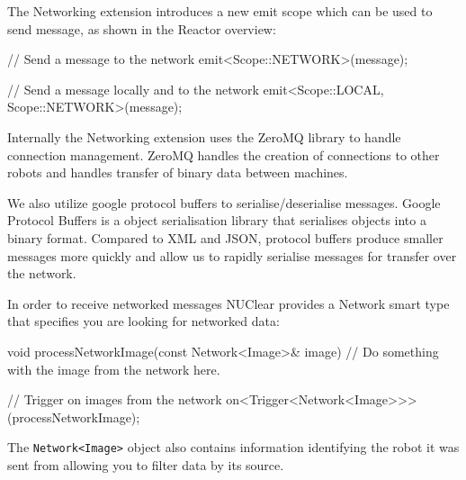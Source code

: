 \documentclass[english,12pt]{scrartcl}
\begin{document}
				The Networking extension introduces a new emit scope which can be used to send message, as shown in the Reactor overview:
				
				\begin{cppcode}
					// Send a message to the network
					emit<Scope::NETWORK>(message);
					
					// Send a message locally and to the network
					emit<Scope::LOCAL, Scope::NETWORK>(message);
				\end{cppcode}
				
				Internally the Networking extension uses the ZeroMQ library to handle connection management.
				ZeroMQ handles the creation of connections to other robots and handles transfer of binary data between machines.
				
				We also utilize google protocol buffers to serialise/deserialise messages. 
				Google Protocol Buffers is a object serialisation library that serialises objects into a binary format.
				Compared to XML and JSON, protocol buffers produce smaller messages more quickly and allow us to rapidly serialise messages for transfer over the network.
				
				In order to receive networked messages NUClear provides a Network smart type that specifies you are looking for networked data:
				
				\begin{cppcode}
					void processNetworkImage(const Network<Image>& image) {
					    // Do something with the image from the network here.
					}
					
					// Trigger on images from the network
					on<Trigger<Network<Image>>>(processNetworkImage);
				\end{cppcode}
				
				The \texttt{Network<Image>} object also contains information identifying the robot it was sent from allowing you to filter data by its source.
				
\end{document}
